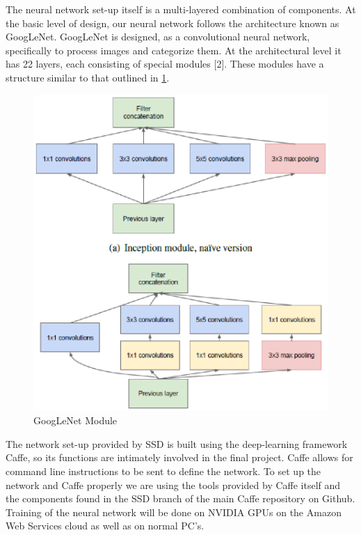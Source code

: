 \documentclass[onecolumn, draftclsnofoot,10pt, compsoc]{IEEEtran}
\begin{document}
The neural network set-up itself is a multi-layered combination of components. At the basic level of design, our neural
network follows the architecture known as GoogLeNet. GoogLeNet is designed, as a convolutional neural network,
specifically to process images and categorize them. At the architectural level it has 22 layers, each consisting of special
modules [2]. These modules have a structure similar to that outlined in \ref{fig:4.1}.
\newline
\newline
\begin{figure}
  \includegraphics{GoogLeNetModule.eps}
  \caption{GoogLeNet Module}
  \label{fig:4.1}
\end{figure}The network set-up provided by SSD is built using the deep-learning framework Caffe, so its functions are intimately involved in the final project.
Caffe allows for command line instructions to be sent to define the network.
To set up the network and Caffe properly we are using the tools provided by Caffe itself and the components found in the SSD branch of the main Caffe repository on Github.
\newline
\newline
Training of the neural network will be done on NVIDIA GPUs on the Amazon Web Services cloud as well as on normal PC's.
\end{document}
